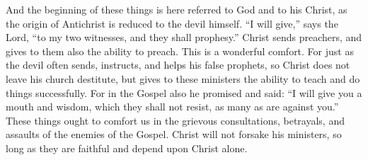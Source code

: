 And the beginning of these things is here referred to God and to his Christ, as the origin of Antichrist is reduced to the devil himself. “I will give,” says the Lord, “to my two witnesses, and they shall prophesy.” Christ sends preachers, and gives to them also the ability to preach. This is a wonderful comfort. For just as the devil often sends, instructs, and helps his false prophets, so Christ does not leave his church destitute, but gives to these ministers the ability to teach and do things successfully. For in the Gospel also he promised and said: “I will give you a mouth and wisdom, which they shall not resist, as many as are against you.” These things ought to comfort us in the grievous consultations, betrayals, and assaults of the enemies of the Gospel. Christ will not forsake his ministers, so long as they are faithful and depend upon Christ alone.

